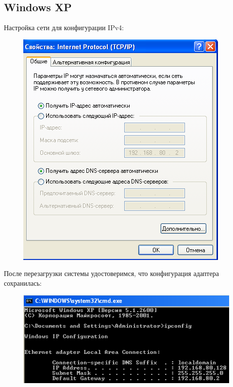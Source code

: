 \documentclass[14pt,a4paper,report]{report}
\begin{document}
\clearpage

\subsection{Windows XP}

Настройка сети для конфигурации IPv4:

\begin{figure}[h!]
	\centering
	\includegraphics[scale = 1.00]{images/3_1.png}
	\caption{}
	\label{image:7}
\end{figure}

После перезагрузки системы удостоверимся, что конфигурация адаптера сохранилась:

\begin{figure}[h!]
	\centering
	\includegraphics[scale = 0.95]{images/3_2.png}
	\caption{}
	\label{image:8}
\end{figure}

\clearpage
\end{document}
